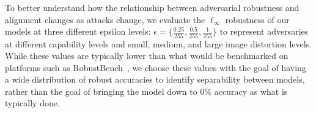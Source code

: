 To better understand how the relationship between adversarial robustness and alignment changes as attacks change, we evaluate the $\ell_\infty$ robustness of our models at three different epsilon levels: $\epsilon = \{\frac{0.25}{255}, \frac{0.5}{255}, \frac{1}{255}\}$ to represent adversaries at different capability levels and small, medium, and large image distortion levels. While these values are typically lower than what would be benchmarked on platforms such as RobustBench~\cite{croce_robustbench_2021}, we choose these values with the goal of having a wide distribution of robust accuracies to identify separability between models, rather than the goal of bringing the model down to 0\% accuracy as what is typically done. 